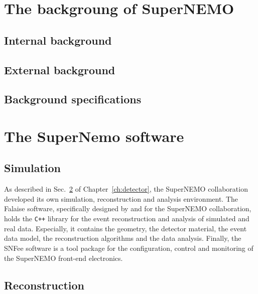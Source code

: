 \section{The backgroung of SuperNEMO}
\label{sec:SNbkg}
\subsection{Internal background}
\subsection{External background}
\subsection{Background specifications}

\section{The SuperNemo software}
\label{sec:SNsoftware}
\subsection{Simulation}

As described in Sec.~\ref{sec:SNsoftware} of Chapter~\ref{ch:detector}, the SuperNEMO collaboration developed its own simulation, reconstruction and analysis environment.
The Falaise software, specifically designed by and for the SuperNEMO collaboration, holds the \verb!C++! library for the event reconstruction and analysis of simulated and real data.
Especially, it contains the geometry, the detector material, the event data model, the reconstruction algorithms and the data analysis.
Finally, the SNFee software is a tool package for the configuration, control and monitoring of the SuperNEMO front-end electronics.

\subsection{Reconstruction}
